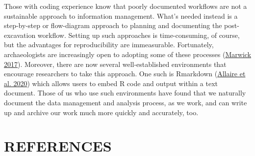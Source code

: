 \documentclass[
]{article}
\begin{document}
Those with coding experience know that poorly documented workflows are
not a sustainable approach to information management. What's needed
instead is a step-by-step or flow-diagram approach to planning and
documenting the post-excavation workflow. Setting up such approaches is
time-consuming, of course, but the advantages for reproducibility are
immeasurable. Fortunately, archaeologists are increasingly open to
adopting some of these processes
(\protect\hyperlink{ref-marwick_computational_2017}{Marwick 2017}).
Moreover, there are now several well-established environments that
encourage researchers to take this approach. One such is Rmarkdown
(\protect\hyperlink{ref-allaire_rmarkdown_2020}{Allaire et al. 2020})
which allows users to embed R code and output within a text document.
Those of us who use such environments have found that we naturally
document the data management and analysis process, as we work, and can
write up and archive our work much more quickly and accurately, too.

\newpage

\hypertarget{references}{%
\section*{REFERENCES}\label{references}}
\end{document}
